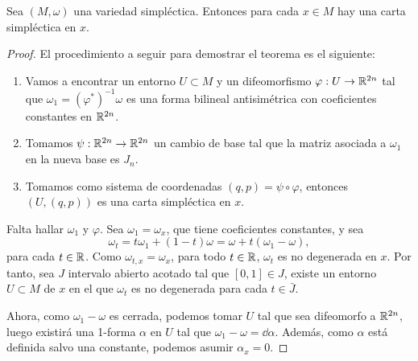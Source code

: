 \begin{thm}[Darboux]
  Sea $(M,\omega)$ una variedad simpléctica. Entonces para cada $x\in M$ hay una carta simpléctica en $x$.
\end{thm}
\begin{proof}
  El procedimiento a seguir para demostrar el teorema es el siguiente:
  \begin{enumerate}
    \item Vamos a encontrar un entorno $U \subset M$ y un difeomorfismo $\varphi : U \rightarrow \mathbb{R}^{2n}$ tal que $\omega_1= (\varphi^*)^{-1}\omega$ es una forma bilineal antisimétrica con coeficientes constantes en $\mathbb{R}^{2n}$.
    \item Tomamos $\psi: \mathbb{R}^{2n} \rightarrow \mathbb{R}^{2n}$ un cambio de base tal que la matriz asociada a $\omega_1$ en la nueva base es $J_n$. 
    \item Tomamos como sistema de coordenadas $(q,p)=\psi \circ \varphi$, entonces $(U,(q,p))$ es una carta simpléctica en $x$.
  \end{enumerate}

\begin{center}
\end{center}

  Falta hallar $\omega_1$ y $\varphi$. Sea $\omega_1=\omega_x$, que tiene coeficientes constantes, y sea
  \begin{equation*}
    \omega_t=t\omega_1 + (1-t) \omega = \omega + t(\omega_1-\omega),
  \end{equation*}
  para cada $t\in \mathbb{R}$. Como $\omega_{t,x}=\omega_x$, para todo $t \in \mathbb{R}$, $\omega_t$ es no degenerada en $x$. Por tanto, sea $J$ intervalo abierto acotado tal que $[0,1]\in J$, existe un entorno $U \subset M$ de $x$ en el que $\omega_t$ es no degenerada para cada $t\in \bar{J}$.

  Ahora, como $\omega_1-\omega$ es cerrada, podemos tomar $U$ tal que sea difeomorfo a $\mathbb{R}^{2n}$, luego existirá una 1-forma $\alpha$ en $U$ tal que $\omega_1-\omega=\dd \alpha$. Además, como $\alpha$ está definida salvo una constante, podemos asumir $\alpha_x=0$.


\end{proof}
